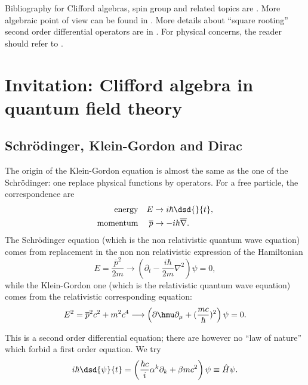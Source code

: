 
Bibliography for Clifford algebras, spin group and related topics are \cite{memP,Michelson,Witkowski,mellor,ResEtaDiracType}. More algebraic point of view  can be found in \cite{Fult,Chevalley}. More details about ``square rooting'' second order differential operators are in \cite{Bronn}. For physical concerns, the reader should refer to \cite{Weinberg,Peskin,schwabl}.

\section{Invitation: Clifford algebra in quantum field theory}

\label{Secqft}
\subsection{Schrödinger, Klein-Gordon and Dirac}

The origin of the Klein-Gordon equation is almost the same as the one of the Schrödinger: one replace physical functions by operators. For a free particle, the correspondence are
\begin{align*}
	\textrm{energy}   &  & E            & \rightarrow i\hbar\dsd{}{t},            \\
	\textrm{momentum} &  & \overline{p} & \rightarrow -i\hbar\overline{ \nabla }.
\end{align*}
The Schrödinger equation (which is the non relativistic quantum wave equation) comes from replacement in the non non relativistic expression of the Hamiltonian
\[
	E=\frac{\overline{p}^2}{2m}\longrightarrow\left(\partial_t-\frac{i\hbar}{2m}\nabla^2\right)\psi=0,
\]
while the Klein-Gordon one (which is the relativistic quantum wave equation) comes from the relativistic corresponding equation:
\[
	E^2=\overline{p}^2c^2+m^2c^4\longrightarrow\left(\partial\hmu\partial_{\mu}+(\frac{mc}{\hbar})^2\right)\psi=0.
\]

This is a second order differential equation; there are however no ``law of nature''{} which forbid a first order equation. We try
\[
	i\hbar\dsd{\psi}{t}
	=\left(\frac{\hbar c}{i}\alpha^k\partial_k+\beta mc^2\right)\psi\equiv \hat{H}\psi.
\]


